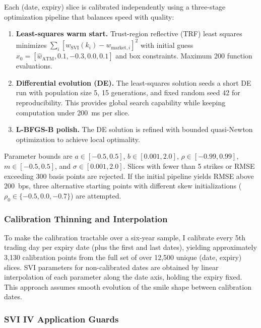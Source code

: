 \documentclass[12pt, letterpaper]{article}
\begin{document}
Each (date, expiry) slice is calibrated independently using a three-stage optimization pipeline that balances speed with quality:

\begin{enumerate}
    \item \textbf{Least-squares warm start.} Trust-region reflective (TRF) least squares minimizes $\sum_i [w_{\text{SVI}}(k_i) - w_{\text{market},i}]^2$ with initial guess $x_0 = [\hat{w}_{\text{ATM}}, 0.1, -0.3, 0.0, 0.1]$ and box constraints. Maximum 200 function evaluations.

    \item \textbf{Differential evolution (DE).} The least-squares solution seeds a short DE run \citep{Storn1997} with population size 5, 15 generations, and fixed random seed 42 for reproducibility. This provides global search capability while keeping computation under 200~ms per slice.

    \item \textbf{L-BFGS-B polish.} The DE solution is refined with bounded quasi-Newton optimization to achieve local optimality.
\end{enumerate}

Parameter bounds are $a \in [-0.5, 0.5]$, $b \in [0.001, 2.0]$, $\rho \in [-0.99, 0.99]$, $m \in [-0.5, 0.5]$, and $\sigma \in [0.001, 2.0]$. Slices with fewer than 5 strikes or RMSE exceeding 300 basis points are rejected. If the initial pipeline yields RMSE above 200~bps, three alternative starting points with different skew initializations ($\rho_0 \in \{-0.5, 0.0, -0.7\}$) are attempted.

\subsubsection{Calibration Thinning and Interpolation}

To make the calibration tractable over a six-year sample, I calibrate every 5th trading day per expiry date (plus the first and last dates), yielding approximately 3,130 calibration points from the full set of over 12,500 unique (date, expiry) slices. SVI parameters for non-calibrated dates are obtained by linear interpolation of each parameter along the date axis, holding the expiry fixed. This approach assumes smooth evolution of the smile shape between calibration dates.

\subsubsection{SVI IV Application Guards}
\end{document}
